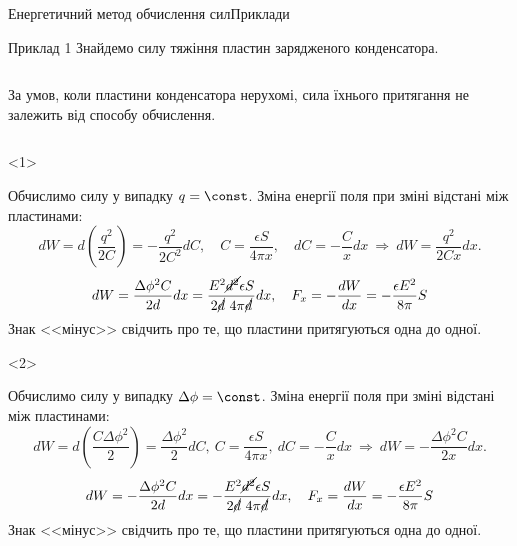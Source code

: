 \documentclass[onlytextwidth]{beamer}
\begin{document}
\begin{frame}{Енергетичний метод обчислення сил}{Приклади}\small
	\begin{exampleblock}{Приклад 1}\justifying
		Знайдемо силу тяжіння пластин зарядженого конденсатора.
	\end{exampleblock}

	\begin{columns}
		\begin{column}{0.8\linewidth}
			\begin{block}{}\justifying
				За умов, коли пластини конденсатора нерухомі, сила їхнього притягання не залежить
				від способу обчислення.
			\end{block}
		\end{column}
		\begin{column}{0.2\linewidth}
			
		\end{column}
	\end{columns}
	\begin{onlyenv}
		\begin{block}{}\justifying
			Обчислимо силу у випадку $q = \const$.
			Зміна енергії поля при зміні відстані між пластинами:
			\begin{equation*}
				dW = d\left(\frac{q^2}{2C} \right)  = -\frac{q^2}{2C^2} dC, \quad C = \frac{\epsilon
					S}{4\pi
					x}, \quad dC = -\frac{C}{x} dx\ \Rightarrow\ dW = \frac{q^2}{2C x} dx.
			\end{equation*}
			\begin{equation*}
				dW = \frac{\Delta\phi^2 C}{2d} dx = \frac{E^2\cancel{d^2} \epsilon S}{2\cancel{d}\ 4\pi
					\cancel{d}} dx,
				\quad F_x = -\frac{dW}{dx} = -\frac{\epsilon E^2}{8\pi} S
			\end{equation*}
			\alert{\scriptsize Знак <<мінус>> свідчить про те, що пластини притягуються одна до одної.}
		\end{block}
	\end{onlyenv}
	\begin{onlyenv}
		\begin{block}{}\justifying
			Обчислимо силу у випадку $\Delta\phi = \const$. Зміна енергії поля при зміні відстані між
			пластинами:
			\begin{equation*}
				dW = d\left(\frac{C \Delta\phi^2}{2} \right)  = \frac{\Delta\phi^2}{2} dC,\ C =
				\frac{\epsilon S}{4\pi
					x},\ dC = -\frac{C}{x} dx\ \Rightarrow\ dW = -\frac{\Delta\phi^2 C}{2x} dx.
			\end{equation*}
			\begin{equation*}
				dW = -\frac{\Delta\phi^2 C}{2d} dx = -\frac{E^2\cancel{d^2} \epsilon
				S}{2\cancel{d}\ 4\pi
					\cancel{d}} dx,
				\quad F_x = \frac{dW}{dx} = -\frac{\epsilon E^2}{8\pi} S
			\end{equation*}
			\alert{\scriptsize Знак <<мінус>> свідчить про те, що пластини притягуються одна до одної.}
		\end{block}
	\end{onlyenv}
\end{frame}
\end{document}
